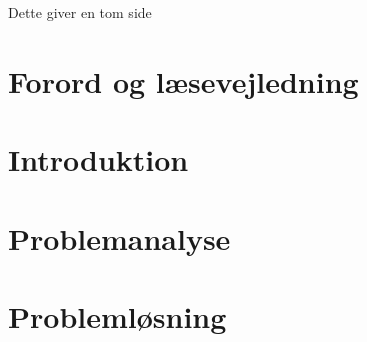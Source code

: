 



\frontmatter


\clearpage
\thispagestyle{empty}
{\color{white}Dette giver en tom side}
\clearpage

 \clearpage
\chapter*{Forord og læsevejledning}\vspace{-.75cm}

\newpage

\tableofcontents* 

\mainmatter

\chapter{Introduktion}\vspace{-.75cm}


\chapter{Problemanalyse}\vspace{-.75cm}









\chapter{Problemløsning}\vspace{-.75cm}













